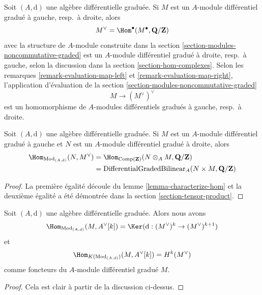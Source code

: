 \noindent
Soit $(A, \text{d})$ une algèbre différentielle graduée. Si $M$ est un
$A$-module différentiel gradué à gauche, resp.\ à droite, alors
$$
M^\vee = \Hom^\bullet(M^\bullet, \mathbf{Q}/\mathbf{Z})
$$
avec la structure de $A$-module construite
dans la section \ref{section-modules-noncommutative-graded} est un
$A$-module différentiel gradué à droite, resp.\ à gauche,
selon la discussion dans la section
\ref{section-hom-complexes}. Selon les
remarques \ref{remark-evaluation-map-left} et \ref{remark-evaluation-map-right},
l'application d'évaluation de la section \ref{section-modules-noncommutative-graded}
$$
M \longrightarrow (M^\vee)^\vee
$$
est un homomorphisme de $A$-modules différentiels gradués à gauche, resp.\ à droite.

\begin{lemma}
\label{lemma-map-into-dual}
Soit $(A, \text{d})$ une algèbre différentielle graduée. Si
$M$ est un $A$-module différentiel gradué à gauche et $N$ est un
$A$-module différentiel gradué à droite, alors
\begin{align*}
\Hom_{\text{Mod}_{(A, \text{d})}}(N, M^\vee)
& =
\Hom_{\text{Comp}(\mathbf{Z})}(N \otimes_A M, \mathbf{Q}/\mathbf{Z}) \\ &
=
\text{DifferentialGradedBilinear}_A(N \times M, \mathbf{Q}/\mathbf{Z})
\end{align*}
\end{lemma}

\begin{proof}
La première égalité découle du lemme
\ref{lemma-characterize-hom} et la deuxième égalité a été démontrée dans la section \ref{section-tensor-product}.
\end{proof}

\begin{lemma}
\label{lemma-hom-into-shift-dual-free}
Soit $(A, \text{d})$ une algèbre différentielle graduée. Alors nous avons
$$
\Hom_{\text{Mod}_{(A, \text{d})}}(M, A^\vee[k]) =
\Ker(\text{d} : (M^\vee)^k \to (M^\vee)^{k + 1})
$$
et
$$
\Hom_{K(\text{Mod}_{(A, \text{d})})}(M, A^\vee[k]) = H^k(M^\vee)
$$
comme foncteurs du $A$-module différentiel gradué $M$.
\end{lemma}

\begin{proof}
Cela est clair à partir de la discussion ci-dessus.
\end{proof}















